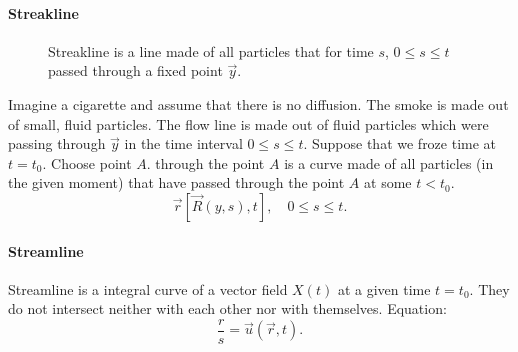 \documentclass[../main.tex]{subfiles}
\begin{document}
    
    
    \paragraph{Streakline}

    \begin{figure}
      \centering
      \caption{Streakline is a line made of all particles that for time $s$, $0 \leq s \leq t$ 
      passed through a fixed point $\vec y$.}
      \label{fig:1.11}
    \end{figure}

    

    Imagine a cigarette and assume that there is no diffusion. 
    The smoke is made out of small, fluid particles.
    The flow line is made out of fluid particles which were passing through $\vec y$ in the time interval
    $0 \leq s \leq t$.
    Suppose that we froze time at $t = t_0$.
    Choose point $A$.
     through the point $A$ is a curve made of all particles (in the given moment) that have passed
    through the point $A$ at some $t < t_0$.
    \begin{displaymath}
      \vec r [ \vec R(y,s), t], \quad 0 \leq s \leq t.
    \end{displaymath}

    \paragraph{Streamline}
    Streamline is a integral curve of a vector field $X(t)$ at a given time $t = t_0$.
    They do not intersect neither with each other nor with themselves.
    Equation:
    \begin{displaymath}
      \dfrac{r}{s} = \vec u(\vec r, t).
    \end{displaymath}
\end{document}
